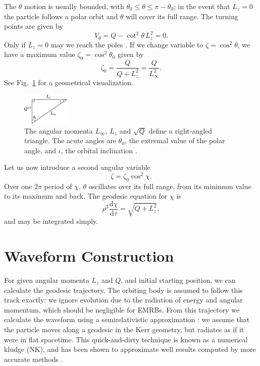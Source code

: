 \documentclass[useAMS,usedcolumn,usegraphicx,usenatbib]{mn2e}
\newcommand{\figref}[1]{Fig.~\ref{fig:#1}}
\newcommand{\dd}{\ensuremath{\mathrm{d}}}
\newcommand{\diff}[2]{\ensuremath{\frac{\dd {#1}}{\dd {#2}}}}
\begin{document}
The $\theta$ motion is usually bounded, with $\theta_0 \leq \theta \leq \pi - \theta_0$; in the event that $L_z = 0$ the particle follows a polar orbit and $\theta$ will cover its full range. The turning points are given by
\begin{equation}
V_\theta = Q - \cot^2\theta\, L_z^2 = 0.
\end{equation}
Only if $L_z = 0$ may we reach the poles \citep{Wilkins1972}. If we change variable to $\zeta = \cos^2\theta$, we have a maximum value $\zeta_0 = \cos^2\theta_0$ given by
\begin{equation}
\label{eq:theta_0}
\zeta_0 = \frac{Q}{Q+L_z^2} = \frac{Q}{L_\infty^2}.
\end{equation}
See \figref{L_triangle} for a geometrical visualization.
\begin{figure}
\begin{center}
\includegraphics[width=0.2\textwidth]{Triangle.eps}
    \caption{The angular momenta $L_\infty$, $L_z$ and $\sqrt{Q}$ define a right-angled triangle. The acute angles are $\theta_0$, the extremal value of the polar angle, and $\iota$, the orbital inclination \citep*{Glampedakis2002}.}
   \label{fig:L_triangle}
\end{center}
\end{figure}
Let us now introduce a second angular variable \citep{Drasco2004}
\begin{equation}
\zeta = \zeta_0\cos^2\chi.
\end{equation}
Over one $2\pi$ period of $\chi$, $\theta$ oscillates over its full range, from its minimum value to its maximum and back. The geodesic equation for $\chi$ is
\begin{equation}
\rho^2\diff{\chi}{\tau} = \sqrt{Q + L_z^2},
\end{equation}
and may be integrated simply.

\section{Waveform Construction}\label{sec:Kludge}

For given angular momenta $L_z$ and $Q$, and initial starting position, we can calculate the geodesic trajectory. The orbiting body is assumed to follow this track exactly: we ignore evolution due to the radiation of energy and angular momentum, which should be negligible for EMRBs. From this trajectory we calculate the waveform using a semirelativistic approximation \citep{Ruffini1981}: we assume that the particle moves along a geodesic in the Kerr geometry, but radiates as if it were in flat spacetime. This quick-and-dirty technique is known as a numerical kludge (NK), and has been shown to approximate well results computed by more accurate methods \citep{Babak2007}.
\end{document}
